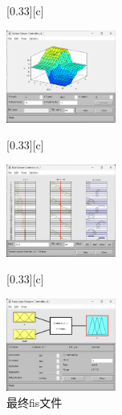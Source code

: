 \documentclass[12pt,a4paper,UTF8]{article}
\begin{document}
\begin{figure}[!htbp]
    \centering
    [0.33\textwidth][c]{
        \centering
        \includegraphics[width=0.32\textwidth]{figures/2024-12-13-22-13-43.png} 
         
    }%
        [0.33\textwidth][c]{
        \centering
        \includegraphics[width=0.32\textwidth]{figures/2024-12-13-22-14-17.png} 
         
    }%
        [0.33\textwidth][c]{
        \centering
        \includegraphics[width=0.32\textwidth]{figures/2024-12-13-22-14-35.png} 
         
    }%
    \caption{最终fis文件}
     
\end{figure}
\end{document}
